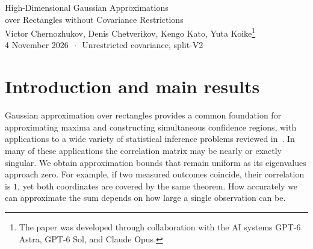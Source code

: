 \documentclass[11pt,letterpaper]{article}
\theoremstyle{remark}
\begin{document}
\begin{center}
{\Large High-Dimensional Gaussian Approximations\\[0.15em]
over Rectangles without Covariance Restrictions}\\[0.85em]
{\normalsize Victor Chernozhukov, Denis Chetverikov, Kengo Kato, Yuta
Koike\renewcommand{\thefootnote}{\fnsymbol{footnote}}\footnote{The paper
was developed through collaboration with the AI systems GPT-6 Astra,
GPT-6 Sol, and Claude Opus.}}\\[0.65em]
{\normalsize 4 November 2026 \(\,\cdot\,\) Unrestricted covariance, split-V2}
\end{center}
\setcounter{footnote}{0}
\thispagestyle{plain}

\begin{abstract}

We study Gaussian approximation over rectangles for a sum of independent
centered random vectors. We require positive marginal variances and allow
arbitrary dependence among the coordinates, including exact linear dependence.
For \(n\) observations bounded coordinatewise by \(B\), with unit marginal
variances after normalization, the approximation error is at most
\[
 C\,\frac{B L^{3/2}}{\sqrt n}
 \sqrt{1+\log_+\!\left(\frac{\sqrt n}{B\sqrt L}\right)},
 \qquad L:=\log(ep),\quad \log_+x:=\max\{0,\log x\}.
\]
A refinement charges a fourth-moment bound relative to the covariance for the logarithmic term. It removes the extra logarithmic factor when large summands contribute little to the variance in every standardized direction. A bounded symmetric example attains the \(n^{-1/2}L^{3/2}\) scale for a fixed
envelope. Whether the remaining logarithm can be removed is open.
Clipping gives a corresponding result for sub-exponential coordinates.
For polynomial moment envelopes the rate changes with the moment order.
At order \(4\), under a separate coordinate fourth-moment bound, symmetric
examples attain the \(n^{-1/4}L^{5/4}\) rate for a fixed envelope.
For growing envelopes, the upper and lower bounds also match in their
dependence on \(B\) in the dimension regimes specified below.
\end{abstract}

\begingroup
\setcounter{tocdepth}{1}
\small
\tableofcontents
\endgroup
\clearpage

\section{\texorpdfstring{Introduction and main results}{Introduction and main results}}\label{sec:results}
Gaussian approximation over rectangles provides a common foundation for
approximating maxima and constructing simultaneous confidence regions, with
applications to a wide variety of statistical inference problems reviewed in~\cite{CCKK2023}.
In many of these applications the correlation matrix may be nearly or
exactly singular. We obtain approximation bounds that remain uniform
as its eigenvalues approach zero. For example, if two measured outcomes
coincide, their correlation is \(1\), yet both coordinates are covered
by the same theorem. How accurately we can approximate the sum depends on how large a
single observation can be.
\end{document}
